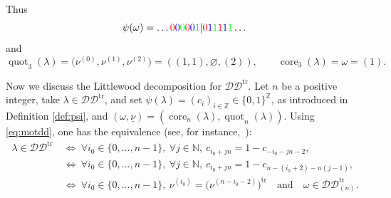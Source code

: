 \documentclass[pdftex]{sigma}
\numberwithin{equation}{section}
\def\ccdd{\mathcal {DD}}
\DeclareMathOperator{\core}{core}
\DeclareMathOperator{\quot}{quot}
\newcommand{\Z}{\mathbb{Z}}
\begin{document}
Thus
\[
\psi(\omega)=\dots \color{red}{0} \color{blue}{0} \color{green}{0} \color{red}{0} \color{blue}{0}\color{green}{1} \color{black}| \color{red}{0} \color{blue}{1} \color{green}{1} \color{red}{1} \color{blue}{1} \color{green}{1}\color{black}\dots
\]
and
\[
\quot_3(\lambda)=\bigl(\nu^{(0)},\nu^{(1)},\nu^{(2)}\bigr)=((1,1),\varnothing,(2)),\qquad \core_3(\lambda)= \omega=(1).%
\]

Now we discuss the Littlewood decomposition for $\ccdd^{\mathrm{tr}}$. Let $n$ be a positive integer, take $\lambda\in \ccdd^{\mathrm{tr}}$, and set $\psi(\lambda)=(c_i)_{i \in\mathbb{Z}}\in \lbrace 0,1\rbrace^\Z$, as introduced in Definition \ref{def:psi}, and $(\omega,\underline{\nu})=(\core_n(\lambda),\quot_n(\lambda))$. Using \eqref{eq:motdd}, one has the equivalence (see, for instance,~\cite{Wmac}):
\begin{align*}%
\lambda\in \ccdd^{\mathrm{tr}} \ &\iff \ \forall i_0 \in \lbrace 0,\dots,n-1\rbrace,\ \forall j \in \mathbb{N},\ c_{i_0+jn}=1-c_{-i_0-jn-2},\\
&\iff \  \forall i_0 \in \lbrace 0,\dots,n-1\rbrace,\ \forall j \in \mathbb{N},\ c_{i_0+jn}=1-c_{n-(i_0+2)-n(j-1)},\\
&\iff \ \forall i_0 \in \lbrace 0,\dots,n-1 \rbrace,\ \nu^{(i_0)}=\bigl(\nu^{(n-i_0-2)}\bigr)^{\mathrm{tr}}\quad \text{and}\quad \omega \in \ccdd^{\mathrm{tr}}_{(n)} .
\end{align*}
\end{document}
